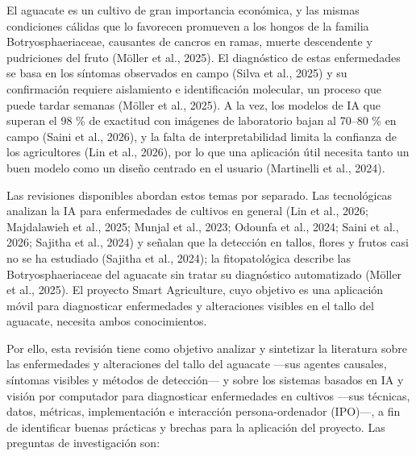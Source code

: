 \documentclass[11pt]{article}
\newcommand{\sangria}{\hspace*{1.27cm}}
\begin{document}
\sangria El aguacate es un cultivo de gran importancia económica, y las mismas condiciones cálidas que lo favorecen promueven a los hongos de la familia Botryosphaeriaceae, causantes de cancros en ramas, muerte descendente y pudriciones del fruto (Möller et al., 2025). El diagnóstico de estas enfermedades se basa en los síntomas observados en campo (Silva et al., 2025) y su confirmación requiere aislamiento e identificación molecular, un proceso que puede tardar semanas (Möller et al., 2025). A la vez, los modelos de IA que superan el 98 \% de exactitud con imágenes de laboratorio bajan al 70–80 \% en campo (Saini et al., 2026), y la falta de interpretabilidad limita la confianza de los agricultores (Lin et al., 2026), por lo que una aplicación útil necesita tanto un buen modelo como un diseño centrado en el usuario (Martinelli et al., 2024).

\sangria Las revisiones disponibles abordan estos temas por separado. Las tecnológicas analizan la IA para enfermedades de cultivos en general (Lin et al., 2026; Majdalawieh et al., 2025; Munjal et al., 2023; Odounfa et al., 2024; Saini et al., 2026; Sajitha et al., 2024) y señalan que la detección en tallos, flores y frutos casi no se ha estudiado (Sajitha et al., 2024); la fitopatológica describe las Botryosphaeriaceae del aguacate sin tratar su diagnóstico automatizado (Möller et al., 2025). El proyecto Smart Agriculture, cuyo objetivo es una aplicación móvil para diagnosticar enfermedades y alteraciones visibles en el tallo del aguacate, necesita ambos conocimientos.

\sangria Por ello, esta revisión tiene como objetivo analizar y sintetizar la literatura sobre las enfermedades y alteraciones del tallo del aguacate —sus agentes causales, síntomas visibles y métodos de detección— y sobre los sistemas basados en IA y visión por computador para diagnosticar enfermedades en cultivos —sus técnicas, datos, métricas, implementación e interacción persona-ordenador (IPO)—, a fin de identificar buenas prácticas y brechas para la aplicación del proyecto. Las preguntas de investigación son:
\end{document}
